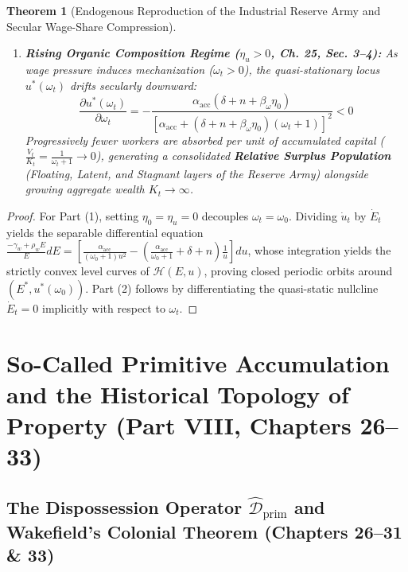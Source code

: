 \documentclass[11pt,a4paper]{article}
\newtheorem{theorem}{Theorem}[section]
\begin{document}
\begin{theorem}[Endogenous Reproduction of the Industrial Reserve Army and Secular Wage-Share Compression]
\begin{enumerate}[label=(\arabic*)]
    \item \textbf{Rising Organic Composition Regime ($\eta_u > 0$, Ch. 25, Sec. 3--4):} As wage pressure induces mechanization ($\dot{\omega}_t > 0$), the quasi-stationary locus $u^*(\omega_t)$ drifts secularly downward:
    \begin{equation}
        \frac{\partial u^*(\omega_t)}{\partial \omega_t} = -\frac{\alpha_{\text{acc}}(\delta + n + \beta_\omega \eta_0)}{\left[\alpha_{\text{acc}} + (\delta + n + \beta_\omega \eta_0)(\omega_t + 1)\right]^2} < 0
    \end{equation}
    Progressively fewer workers are absorbed per unit of accumulated capital ($\frac{V_t}{K_t} = \frac{1}{\omega_t + 1} \to 0$), generating a consolidated \textbf{Relative Surplus Population} (Floating, Latent, and Stagnant layers of the Reserve Army) alongside growing aggregate wealth $K_t \to \infty$.
\end{enumerate}
\end{theorem}

\begin{proof}
For Part (1), setting $\eta_0 = \eta_u = 0$ decouples $\omega_t = \omega_0$. Dividing $\dot{u}_t$ by $\dot{E}_t$ yields the separable differential equation $\frac{-\gamma_w + \rho_w E}{E} dE = \left[\frac{\alpha_{\text{acc}}}{(\omega_0+1)u^2} - \left(\frac{\alpha_{\text{acc}}}{\omega_0+1} + \delta + n\right)\frac{1}{u}\right] du$, whose integration yields the strictly convex level curves of $\mathcal{H}(E, u)$, proving closed periodic orbits around $(E^*, u^*(\omega_0))$. Part (2) follows by differentiating the quasi-static nullcline $\dot{E}_t = 0$ implicitly with respect to $\omega_t$.
\end{proof}

\section{So-Called Primitive Accumulation and the Historical Topology of Property (Part VIII, Chapters 26--33)}

\subsection{The Dispossession Operator $\hat{\mathcal{D}}_{\text{prim}}$ and Wakefield's Colonial Theorem (Chapters 26--31 \& 33)}
\end{document}
